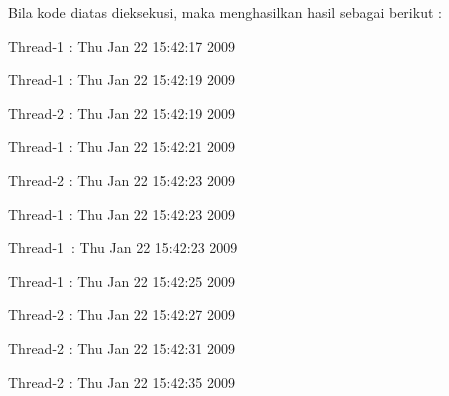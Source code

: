 \vspace{80pt}	
Bila kode diatas dieksekusi, maka menghasilkan hasil sebagai berikut : \par
\vspace{10pt}
\noindent 
\begin{center}{\fontsize{10pt}{10pt}\selectfont Thread-1 : Thu Jan 22 15:42:17 2009}\end{center} \par
\noindent 
\begin{center}{\fontsize{10pt}{10pt}\selectfont Thread-1 : Thu Jan 22 15:42:19 2009}\end{center} \par
\noindent 
\begin{center}{\fontsize{10pt}{10pt}\selectfont Thread-2 : Thu Jan 22 15:42:19 2009}\end{center} \par
\noindent 
\begin{center}{\fontsize{10pt}{10pt}\selectfont Thread-1 : Thu Jan 22 15:42:21 2009}\end{center} \par
\noindent 
\begin{center}{\fontsize{10pt}{10pt}\selectfont Thread-2 : Thu Jan 22 15:42:23 2009}\end{center} \par
\noindent 
\begin{center}{\fontsize{10pt}{10pt}\selectfont Thread-1 : Thu Jan 22 15:42:23 2009}\end{center} \par
\noindent 
\begin{center}{\fontsize{10pt}{10pt}\selectfont Thread-1~:  Thu Jan 22 15:42:23 2009}\end{center} \par
\noindent 
\begin{center}{\fontsize{10pt}{10pt}\selectfont Thread-1 : Thu Jan 22 15:42:25 2009}\end{center} \par
\noindent 
\begin{center}{\fontsize{10pt}{10pt}\selectfont Thread-2 : Thu Jan 22 15:42:27 2009}\end{center} \par
\noindent 
\begin{center}{\fontsize{10pt}{10pt}\selectfont Thread-2 : Thu Jan 22 15:42:31 2009}\end{center} \par
\noindent 
\begin{center}{\fontsize{10pt}{10pt}\selectfont Thread-2 : Thu Jan 22 15:42:35 2009}\end{center} \par

